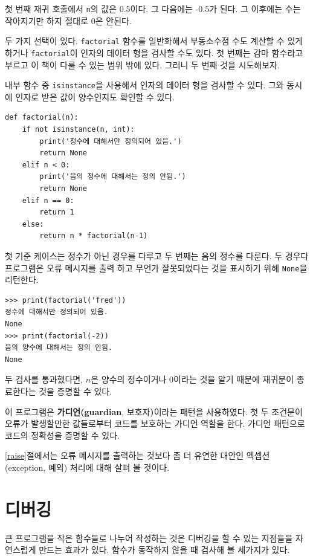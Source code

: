 \documentclass[10pt]{book}
\begin{document}
첫 번째 재귀 호출에서 {\tt n}의 값은 0.5이다.  그 다음에는 -0.5가
된다.  그 이후에는 수는 작아지기만 하지 절대로 0은 안된다.

두 가지 선택이 있다.  {\tt factorial} 함수를 일반화해서 부동소수점 수도
계산할 수 있게 하거나 {\tt factorial}이 인자의 데이터 형을 검사할 수도
있다.  첫 번째는 감마 함수라고 부르고 이 책이 다룰 수 있는 범위 밖에
있다.  그러니 두 번째 것을 시도해보자.

내부 함수 중 {\tt isinstance}을 사용해서 인자의 데이터 형을 검사할 수
있다.  그와 동시에 인자로 받은 값이 양수인지도 확인할 수 있다.

\begin{verbatim}
def factorial(n):
    if not isinstance(n, int):
        print('정수에 대해서만 정의되어 있음.')
        return None
    elif n < 0:
        print('음의 정수에 대해서는 정의 안됨.')
        return None
    elif n == 0:
        return 1
    else:
        return n * factorial(n-1)
\end{verbatim}
%
첫 기준 케이스는 정수가 아닌 경우를 다루고 두 번째는 음의 정수를
다룬다.  두 경우다 프로그램은 오류 메시지를 출력 하고 무언가
잘못되었다는 것을 표시하기 위해 {\tt None}을 리턴한다.


\begin{verbatim}
>>> print(factorial('fred'))
정수에 대해서만 정의되어 있음.
None
>>> print(factorial(-2))
음의 양수에 대해서는 정의 안됨.
None
\end{verbatim}
% 
두 검사를 통과했다면, $n$은 양수의 정수이거나 0이라는 것을 알기 때문에
재귀문이 종료한다는 것을 증명할 수 있다.

이 프로그램은 {\bf 가디언(guardian}, 보호자{\bf)}이라는 패턴을
사용하였다.  첫 두 조건문이 오류가 발생할만한 값들로부터 코드를
보호하는 가디언 역할을 한다.  가디언 패턴으로 코드의 정확성을 증명할 수
있다. 

\ref{raise}절에서는 오류 메시지를 출력하는 것보다 좀 더 유연한 대안인
엑셉션(exception, 예외) 처리에 대해 살펴 볼 것이다.


\section{디버깅}
\label{factdebug}
큰 프로그램을 작은 함수들로 나누어 작성하는 것은 디버깅을 할 수 있는 지점들을 자연스럽게 만드는 효과가 있다.  함수가 동작하지 않을 때 검사해 볼 세가지가 있다. 
\end{document}
